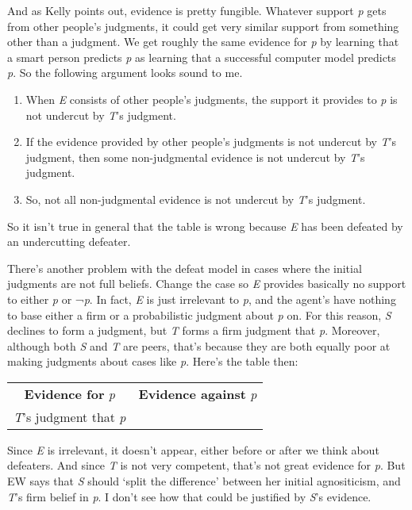 \documentclass[
  10pt,
  letterpaper,
  DIV=11,
  numbers=noendperiod,
  twoside]{scrartcl}
\providecommand{\tightlist}{%
  \setlength{\itemsep}{0pt}\setlength{\parskip}{0pt}}\usepackage{longtable,booktabs,array}
\begin{document}
And as Kelly points out, evidence is pretty fungible. Whatever support
\emph{p} gets from other people's judgments, it could get very similar
support from something other than a judgment. We get roughly the same
evidence for \emph{p} by learning that a smart person predicts \emph{p}
as learning that a successful computer model predicts \emph{p}. So the
following argument looks sound to me.

\begin{enumerate}
\def\labelenumi{\arabic{enumi}.}
\tightlist
\item
  When \emph{E} consists of other people's judgments, the support it
  provides to \emph{p} is not undercut by \emph{T}'s judgment.
\item
  If the evidence provided by other people's judgments is not undercut
  by \emph{T}'s judgment, then some non-judgmental evidence is not
  undercut by \emph{T}'s judgment.
\item
  So, not all non-judgmental evidence is not undercut by \emph{T}'s
  judgment.
\end{enumerate}

So it isn't true in general that the table is wrong because \emph{E} has
been defeated by an undercutting defeater.

There's another problem with the defeat model in cases where the initial
judgments are not full beliefs. Change the case so \emph{E} provides
basically no support to either \emph{p} or ¬\emph{p}. In fact, \emph{E}
is just irrelevant to \emph{p}, and the agent's have nothing to base
either a firm or a probabilistic judgment about \emph{p} on. For this
reason, \emph{S} declines to form a judgment, but \emph{T} forms a firm
judgment that \emph{p}. Moreover, although both \emph{S} and \emph{T}
are peers, that's because they are both equally poor at making judgments
about cases like \emph{p}. Here's the table then:

\begin{longtable}[]{@{}cc@{}}
\toprule\noalign{}
\endhead
\bottomrule\noalign{}
\endlastfoot
\textbf{Evidence for} \emph{p} & \textbf{Evidence against} \emph{p} \\
\emph{T}'s judgment that \emph{p} & \\
\end{longtable}

Since \emph{E} is irrelevant, it doesn't appear, either before or after
we think about defeaters. And since \emph{T} is not very competent,
that's not great evidence for \emph{p}. But EW says that \emph{S} should
`split the difference' between her initial agnositicism, and \emph{T}'s
firm belief in \emph{p}. I don't see how that could be justified by
\emph{S}'s evidence.
\end{document}
